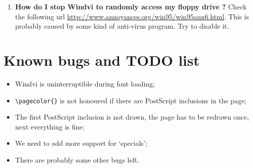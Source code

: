 \documentclass[a4paper,11pt]{article}
\def\WDVI{\textsf{Windvi}}
\begin{document}
\begin{enumerate}
\begin{quotation}
    Installing windvi under MikTeX under WinNT 4.0
    Assuming you are set up like I am:

    MikTeX in  \verb|c:\texmf|
    and GSTools in  \verb|c:\gstools|

    \begin{itemize}
    \item Make a directory \verb|c:\texmf\windvi| 
    \item unpack windvi.zip in this directory
    \item Put *.exe in \verb|c:\texmf\miktex\bin|
    \item Put \verb|render.ps| in \verb|c:\texmf\dvips|
    \item Under the system control panel click the \textsl{Environment
        tab} and add:
\begin{verbatim}
      TEXMFCNF c:\texmf\windvi
      TEXMFMAIN c:\texmf 
      path c:\gstools\gs5.10 
      GS_LIB c:\gstools\gs5.10;c:\gstools\gs5.10\fonts 
\end{verbatim}
    \item Edit \verb|c:\texmf\windvi\texmf.cnf|
      \begin{itemize}
      \item change \verb|TEXMFMAIN = c:/texmf|
      \item change \verb|VARTEXFONTS = c:/texmf/fonts|
    \end{itemize}
\end{itemize}
  \end{quotation}

Read carefully the kpathsea documentation, and try your settings with
the \texttt{mktexnam.exe} and \texttt{kpsewhich.exe} programs.
Report any settings needed to enhance this FAQ section.

\item \textbf{How do I stop \WDVI{} to randomly access my floppy drive 
    ? } Check the following url
  \url{http://www.annoyances.org/win95/win95ann6.html}. This is
  probably caused by some kind of anti-virus program. Try to disable
  it.

\end{enumerate}

\section{Known bugs and TODO list}

\begin{itemize}
\item \WDVI{} is uninterruptible during font loading;
\item \verb+\pagecolor{}+ is not honoured if there are PostScript
  inclusions in the page;
\item The first PostScript inclusion is not drawn, the page has to be
  redrawn once, next everything is fine; 
\item We need to add more support for `specials';
\item There are probably some other bugs left.
\end{itemize}
\end{document}
